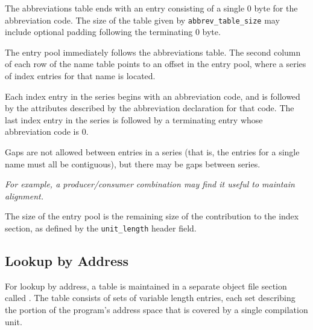 The abbreviations table ends with an entry consisting of a single 0
byte for the abbreviation code. The size of the table given by
\texttt{abbrev\_table\_size} may include optional padding following the
terminating 0 byte.

The entry pool immediately follows the abbreviations table. The second
column of each row of the name table points to an offset in the entry
pool, where a series of index entries for that name is located.

Each index entry in the series begins with an abbreviation code, and is
followed by the attributes described by the abbreviation declaration
for that code. The last index entry in the series is followed by a
terminating entry whose abbreviation code is 0.

Gaps are not allowed between entries in a series (that is, the entries
for a single name must all be contiguous), but there may be gaps
between series.

\textit{For example, a producer/consumer combination may find
it useful to maintain alignment.}

The size of the entry pool is the remaining size of the contribution to
the index section, as defined by the \texttt{unit\_length} header field.

\subsection{Lookup by Address}
\label{chap:lookupbyaddress}
For 
lookup by address, a table is maintained in a separate
object file section called 
\dotdebugaranges{}. The table consists
of sets of variable length entries, each set describing the
portion of the program\textquoteright{}s address space that is covered by
a single compilation unit.

